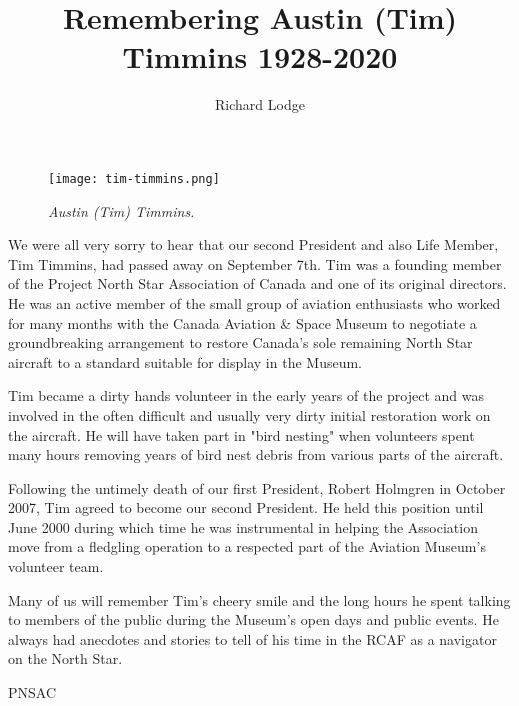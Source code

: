 
%


\title{Remembering Austin (Tim) Timmins 1928-2020}
\author{Richard Lodge}

\maketitle

\begin{figure}[htbp]
   \vspace{2em}
   \centering
   \texttt{[image: tim-timmins.png]}
   \caption*{\small \em Austin (Tim) Timmins.}
   \label{fig:tim}
\end{figure}

We were all very sorry to hear that our second President and also Life Member,
Tim Timmins, had passed away on September 7th. Tim was a founding member of the
Project North Star Association of Canada and one of its original directors. He
was an active member of the small group of aviation enthusiasts who worked for
many months with the Canada Aviation \& Space Museum to negotiate a
groundbreaking arrangement to restore Canada's sole remaining North Star
aircraft to a standard suitable for display in the Museum.

Tim became a dirty hands volunteer in the early years of the project and was
involved in the often difficult and usually very dirty initial restoration work
on the aircraft. He will have taken part in "bird nesting" when volunteers
spent many hours removing years of bird nest debris from various parts of the
aircraft.

Following the untimely death of our first President, Robert Holmgren in October
2007, Tim agreed to become our second President. He held this position until
June 2000 during which time he was instrumental in helping the Association move
from a fledgling operation to a respected part of the Aviation Museum's
volunteer team.

Many of us will remember Tim's cheery smile and the long hours he spent talking
to members of the public during the Museum's open days and public events. He
always had anecdotes and stories to tell of his time in the RCAF as a navigator
on the North Star. 

\begin{footnotesize}
    \raggedleft PNSAC\\
\end{footnotesize}



